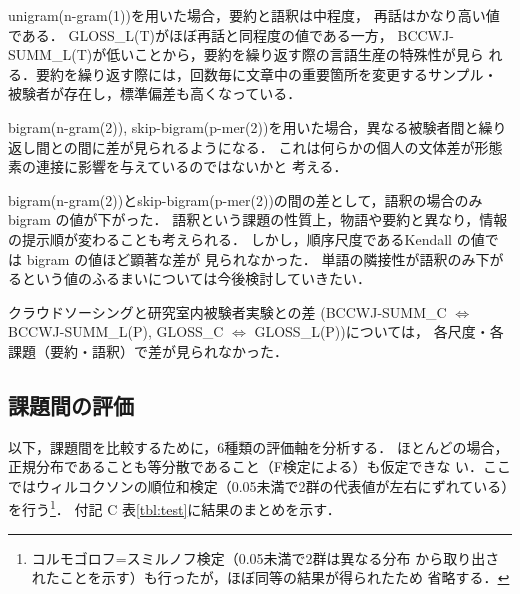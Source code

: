 \documentclass[japanese]{jnlp_1.4}
\newcommand{\modified}[1]{}
\begin{document}
unigram(n-gram(1))を用いた場合，要約と語釈は中程度，
再話はかなり高い値である．
GLOSS\_{\linebreak}L(T)がほぼ再話と同程度の値である一方，
BCCWJ-SUMM\_L(T)が低いことから，要約を繰り返す際の言語生産の特殊性が見ら
れる．要約を繰り返す際には，回数毎に文章中の重要箇所を変更するサンプル・
被験者が存在し，標準偏差も高くなっている．

bigram(n-gram(2)), skip-bigram(p-mer(2))を用いた場合，異なる被験者間と繰り返し間との間に差が見られるようになる．
これは何らかの個人の文体差が形態素の連接に影響を与えているのではないかと
考える．

bigram(n-gram(2))とskip-bigram(p-mer(2))の間の差として，語釈の場合のみ
bigram の値が下がった．
語釈という課題の性質上，物語や要約と異なり，情報の提示順が変わることも考えられる．
しかし，順序尺度であるKendall の値では bigram の値ほど顕著な差が
見られなかった．
単語の隣接性が語釈のみ下がるという値のふるまいについては今後検討していきたい．

クラウドソーシングと研究室内被験者実験との差
(BCCWJ-SUMM\_C $\Leftrightarrow$ BCCWJ-SUMM\_L(P),
GLOSS\_C $\Leftrightarrow$ GLOSS\_L(P))については，
各尺度・各課題（要約・語釈）で差が見られなかった．


\subsection{課題間の評価}  
\label{sub:test}

以下，課題間を比較するために，6種類の評価軸を分析する．
ほとんどの場合，正規分布であることも等分散であること（F検定による）も仮定できな
い．ここではウィルコクソンの順位和検定（0.05未満で2群の代表値が左右にずれている）を行う\footnote{コルモゴロフ=スミルノフ検定（0.05未満で2群は異なる分布
   から取り出されたことを示す）も行ったが，ほぼ同等の結果が得られたため
   省略する．}．\modified{多重比較に対応するために Bonferroni法を用いた．}
付記 C 表\ref{tbl:test}に結果のまとめを示す．
\end{document}
